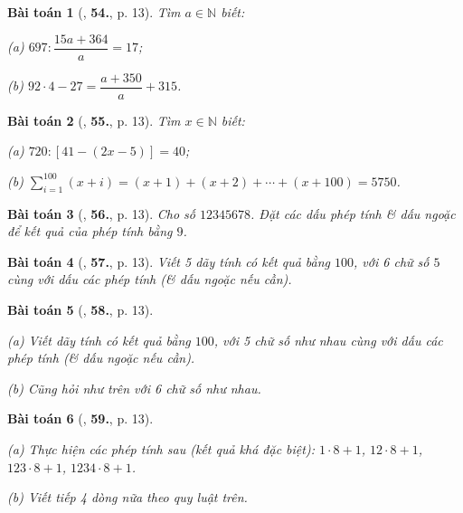 \documentclass{article}
\numberwithin{equation}{section}
\newtheorem{baitoan}{Bài toán}
\begin{document}
\begin{baitoan}[\cite{Binh_Toan_6_tap_1}, \textbf{54.}, p. 13]
	Tìm $a\in\mathbb{N}$ biết:
	\begin{enumerate*}
		\item[(a)] $697:\dfrac{15a + 364}{a} = 17$;
		\item[(b)] $92\cdot4 - 27 = \dfrac{a + 350}{a} + 315$.
	\end{enumerate*}
\end{baitoan}

\begin{baitoan}[\cite{Binh_Toan_6_tap_1}, \textbf{55.}, p. 13]
	Tìm $x\in\mathbb{N}$ biết:
	\begin{enumerate*}
		\item[(a)] $720:[41 - (2x - 5)] = 40$;\\
		\item[(b)] $\sum_{i=1}^{100} (x + i) = (x + 1) + (x + 2) + \cdots + (x + 100) = 5750$.
	\end{enumerate*}
\end{baitoan}

\begin{baitoan}[\cite{Binh_Toan_6_tap_1}, \textbf{56.}, p. 13]
	Cho số $12345678$. Đặt các dấu phép tính \& dấu ngoặc để kết quả của phép tính bằng $9$.
\end{baitoan}

\begin{baitoan}[\cite{Binh_Toan_6_tap_1}, \textbf{57.}, p. 13]
	Viết 5 dãy tính có kết quả bằng $100$, với 6 chữ số $5$ cùng với dấu các phép tính (\& dấu ngoặc nếu cần).
\end{baitoan}

\begin{baitoan}[\cite{Binh_Toan_6_tap_1}, \textbf{58.}, p. 13]
	\begin{enumerate*}
		\item[(a)] Viết dãy tính có kết quả bằng $100$, với 5 chữ số như nhau cùng với dấu các phép tính (\& dấu ngoặc nếu cần).
		\item[(b)] Cũng hỏi như trên với 6 chữ số như nhau.
	\end{enumerate*}
\end{baitoan}

\begin{baitoan}[\cite{Binh_Toan_6_tap_1}, \textbf{59.}, p. 13]
	\begin{enumerate*}
		\item[(a)] Thực hiện các phép tính sau (kết quả khá đặc biệt): $1\cdot8 + 1$, $12\cdot8 + 1$, $123\cdot8 + 1$, $1234\cdot8 + 1$.
		\item[(b)] Viết tiếp 4 dòng nữa theo quy luật trên.
	\end{enumerate*}
\end{baitoan}
\end{document}
